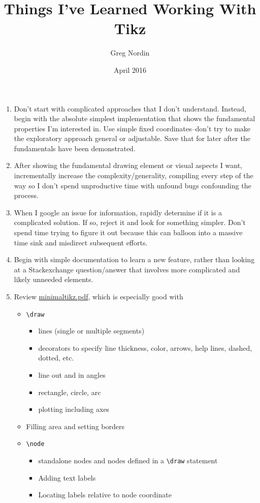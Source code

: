 \documentclass{article}
\title{Things I've Learned Working With Tikz}
\date{April 2016}
\author{Greg Nordin}
\begin{document}
\maketitle

\begin{enumerate}

    \item Don't start with complicated approaches that I don't understand. Instead, begin with the absolute simplest implementation that shows the fundamental properties I'm interested in. Use simple fixed coordinates--don't try to make the exploratory approach general or adjustable. Save that for later after the fundamentals have been demonstrated. 

    \item After showing the fundamental drawing element or visual aspects I want, incrementally increase the complexity/generality, compiling every step of the way so I don't spend unproductive time with unfound bugs confounding the process.

    \item When I google an issue for information, rapidly determine if it is a complicated solution. If so, reject it and look for something simpler. Don't spend time trying to figure it out because this can balloon into a massive time sink and misdirect subsequent efforts.

    \item Begin with simple documentation to learn a new feature, rather than looking at a Stackexchange question/answer that involves more complicated and likely unneeded elements.

    \item Review \href{http://cremeronline.com/LaTeX/minimaltikz.pdf}{minimaltikz.pdf}, which is especially good with
    	\begin{itemize}
		\item \verb!\draw!
		\begin{itemize}
			\item lines (single or multiple segments)
			\item decorators to specify line thickness, color, arrows, help lines, dashed, dotted, etc.
			\item line out and in angles
			\item rectangle, circle, arc
			\item plotting including axes
		\end{itemize}
		\item Filling area and setting borders
		\item \verb!\node!
		\begin{itemize}
			\item standalone nodes and nodes defined in a \verb!\draw! statement
			\item Adding text labels
			\item Locating labels relative to node coordinate
		\end{itemize}
	\end{itemize}


\end{enumerate}
\end{document}

